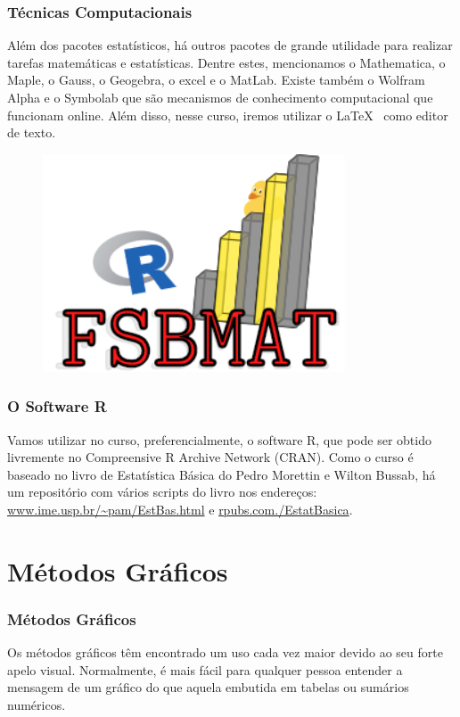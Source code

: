 \documentclass[12pt]{beamer}
\begin{document}
\begin{frame}{}
\frametitle{Técnicas Computacionais}
\begin{block}{}
\justifying
Além dos pacotes estatísticos, há outros pacotes de grande utilidade para realizar tarefas matemáticas e estatísticas. Dentre estes, mencionamos o Mathematica, o Maple, o Gauss, o Geogebra, o excel e o MatLab. Existe também o Wolfram Alpha e o Symbolab que são mecanismos de conhecimento computacional que funcionam online. Além disso, nesse curso, iremos utilizar o \LaTeX~ como editor de texto.
\end{block}
\begin{figure}[H]
    \centering
    \includegraphics[height=0.3\textwidth, width=0.8\textwidth]{figs/mylogo.png}
  \end{figure}
\end{frame}

\begin{frame}{}
\frametitle{O Software R}
\begin{block}{}
\justifying
Vamos utilizar no curso, preferencialmente, o software R, que pode ser obtido livremente no Compreensive R Archive Network (CRAN). Como o curso é baseado no livro de Estatística Básica do Pedro Morettin e Wilton Bussab, há um repositório com vários scripts do livro nos endereços: 
\url{www.ime.usp.br/~pam/EstBas.html} e \url{rpubs.com./EstatBasica}.
\end{block}
\end{frame}

\section{Métodos Gráficos}
\begin{frame}{}
\frametitle{Métodos Gráficos}
\begin{block}{}
\justifying
Os métodos gráficos têm encontrado um uso cada vez maior devido ao seu forte apelo visual. Normalmente, é mais fácil para qualquer pessoa entender a mensagem 
de um gráfico do que aquela embutida em tabelas ou sumários numéricos.
\end{block}
\end{frame}
\end{document}
